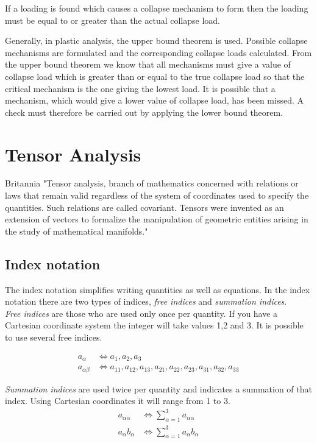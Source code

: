 If a loading is found which causes a collapse mechanism to form then the loading must be equal to or greater than the actual collapse load.

Generally, in plastic analysis, the upper bound theorem is used. Possible collapse mechanisms are formulated and the corresponding collapse loads calculated. From the upper bound theorem we know that all mechanisms must give a value of collapse load which is greater than or equal to the true collapse load so that the critical mechanism is the one giving the lowest load. It is possible that a mechanism, which would give a lower value of collapse load, has been missed. A check must therefore be carried out by applying the lower bound theorem.




\section{Tensor Analysis}

Britannia
"Tensor analysis, branch of mathematics concerned with relations or laws that remain valid regardless of the system of coordinates used to specify the quantities. Such relations are called covariant. Tensors were invented as an extension of vectors to formalize the manipulation of geometric entities arising in the study of mathematical manifolds."

\subsection{Index notation}
The index notation simplifies writing quantities as well as equations. In the index notation there are two types of indices, \textit{free indices} and \textit{summation indices}.\\

\textit{Free indices} are those who are used only once per quantity. If you have a Cartesian coordinate system the integer will take values 1,2 and 3. It is possible to use several free indices.

\begin{align*} 
    a_\alpha  &\Leftrightarrow a_1 , a_2, a_3 \\ 
   a_{\alpha \beta}  &\Leftrightarrow a_{11},a_{12},a_{13},a_{21},a_{22},a_{23},a_{31},a_{32},a_{33}
\end{align*}

\textit{Summation indices} are used twice per quantity and indicates a  summation of that index. Using Cartesian coordinates it will range from 1 to 3.
\begin{align*} 
    a_{\alpha \alpha}  &\Leftrightarrow \sum\limits_{\alpha=1}^3  a_{\alpha \alpha} \\ 
   a_{\alpha}b_\alpha  &\Leftrightarrow \sum\limits_{\alpha=1}^3  a_{\alpha}b_\alpha 
\end{align*}

